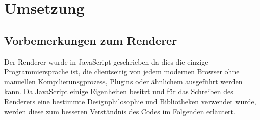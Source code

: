 \chapter{Umsetzung}
\label{chap:umsetzung}

\section{Vorbemerkungen zum Renderer}
\label{sec:renderer}
Der Renderer wurde in JavaScript geschrieben da dies die einzige Programmiersprache ist, die clientseitig von jedem modernen Browser ohne manuellen Kompilierunsgprozess, Plugins oder ähnlichem ausgeführt werden kann. Da JavaScript einige Eigenheiten besitzt und für das Schreiben des Renderers eine bestimmte Designphilosophie und Bibliotheken verwendet wurde, werden diese zum besseren Verständnis des Codes im Folgenden erläutert.

